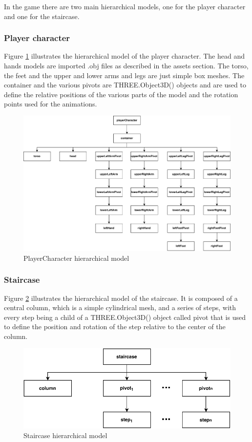 \documentclass[12pt]{article}
\begin{document}
In the game there are two main hierarchical models, one for the player character and one for the staircase.

\subsubsection{Player character}
Figure \ref{fig:playerCharacter} illustrates the hierarchical model of the player character. The head and hands models are imported .obj files as described in the assets section. The torso, the feet and the upper and lower arms and legs are just simple box meshes. The container and the various pivots are THREE.Object3D() objects and are used to define the relative positions of the various parts of the model and the rotation points used for the animations.

\begin{figure}[h]
\centering
\includegraphics[width=\linewidth]{PlayerCharacter}
\caption{PlayerCharacter hierarchical model}
\label{fig:playerCharacter}
\end{figure}

\subsubsection{Staircase}

Figure \ref{fig:staircase} illustrates the hierarchical model of the staircase. It is composed of a central column, which is a simple cylindrical mesh, and a series of steps, with every step being a child of a THREE.Object3D() object called pivot that is used to define the position and rotation of the step relative to the center of the column.

\begin{figure}[h]
\centering
\includegraphics[width=0.7\linewidth]{staircase}
\caption{Staircase hierarchical model}
\label{fig:staircase}
\end{figure}
\end{document}
